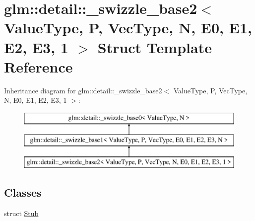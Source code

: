 \hypertarget{structglm_1_1detail_1_1__swizzle__base2_3_01_value_type_00_01_p_00_01_vec_type_00_01_n_00_01_e0_fc19218d69dc8988a4a57fbe7f79725c}{\section{glm\-:\-:detail\-:\-:\-\_\-swizzle\-\_\-base2$<$ Value\-Type, P, Vec\-Type, N, E0, E1, E2, E3, 1 $>$ Struct Template Reference}
\label{structglm_1_1detail_1_1__swizzle__base2_3_01_value_type_00_01_p_00_01_vec_type_00_01_n_00_01_e0_fc19218d69dc8988a4a57fbe7f79725c}
}
Inheritance diagram for glm\-:\-:detail\-:\-:\-\_\-swizzle\-\_\-base2$<$ Value\-Type, P, Vec\-Type, N, E0, E1, E2, E3, 1 $>$\-:\begin{figure}[H]
\begin{center}
\leavevmode
\includegraphics[height=3.000000cm]{structglm_1_1detail_1_1__swizzle__base2_3_01_value_type_00_01_p_00_01_vec_type_00_01_n_00_01_e0_fc19218d69dc8988a4a57fbe7f79725c}
\end{center}
\end{figure}
\subsection*{Classes}
\begin{DoxyCompactItemize}
\item 
struct \hyperlink{structglm_1_1detail_1_1__swizzle__base2_3_01_value_type_00_01_p_00_01_vec_type_00_01_n_00_01_e0_17279995be88bc842083eed40758473c}{Stub}
\end{DoxyCompactItemize}
